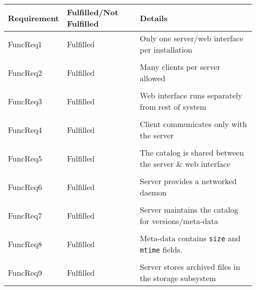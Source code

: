 \begin{longtable}{ l l p{5cm} }
    \toprule
    Requirement         & Fulfilled/Not Fulfilled   & Details
    \\ \midrule
    FuncReq1            & Fulfilled                 & Only one server/web
                                                      interface per
                                                      installation
    \\ \\
    FuncReq2            & Fulfilled                 & Many clients per
                                                      server allowed
    \\ \\
    FuncReq3            & Fulfilled                 & Web interface runs
                                                      separately from rest
                                                      of system
    \\ \\
    FuncReq4            & Fulfilled                 & Client communicates
                                                      only with the server
    \\ \\
    FuncReq5            & Fulfilled                 & The catalog is shared
                                                      between the server \&
                                                      web interface
    \\ \\
    FuncReq6            & Fulfilled                 & Server provides
                                                      a networked daemon
    \\ \\
    FuncReq7            & Fulfilled                 & Server maintains the
                                                      catalog for
                                                      versions/meta-data
    \\ \\
    FuncReq8            & Fulfilled                 & Meta-data contains
                                                      \verb!size! and
                                                      \verb!mtime! fields.
    \\ \\
    FuncReq9            & Fulfilled                 & Server stores
                                                      archived files in the
                                                      storage subsystem

\end{longtable}
